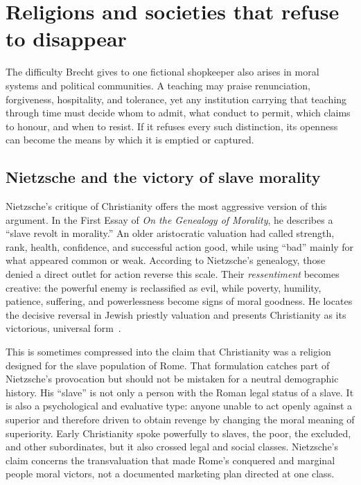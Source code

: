 ﻿\documentclass[12pt,a4paper]{book}
\begin{document}
\section{Religions and societies that refuse to disappear}

The difficulty Brecht gives to one fictional shopkeeper also arises in moral
systems and political communities.  A teaching may praise renunciation,
forgiveness, hospitality, and tolerance, yet any institution carrying that
teaching through time must decide whom to admit, what conduct to permit, which
claims to honour, and when to resist.  If it refuses every such distinction,
its openness can become the means by which it is emptied or captured.

\subsection{Nietzsche and the victory of slave morality}

Nietzsche's critique of Christianity offers the most aggressive version of
this argument.  In the First Essay of \emph{On the Genealogy of Morality}, he
describes a ``slave revolt in morality.''  An older aristocratic valuation had
called strength, rank, health, confidence, and successful action good, while
using ``bad'' mainly for what appeared common or weak.  According to
Nietzsche's genealogy, those denied a direct outlet for action reverse this
scale.  Their \emph{ressentiment} becomes creative: the powerful enemy is
reclassified as evil, while poverty, humility, patience, suffering, and
powerlessness become signs of moral goodness.  He locates the decisive reversal
in Jewish priestly valuation and presents Christianity as its victorious,
universal form~\cite[First Essay, \S\S~7--10 and 16]{Nietzsche-GM}.

This is sometimes compressed into the claim that Christianity was a religion
designed for the slave population of Rome.  That formulation catches part of
Nietzsche's provocation but should not be mistaken for a neutral demographic
history.  His ``slave'' is not only a person with the Roman legal status of a
slave.  It is also a psychological and evaluative type: anyone unable to act
openly against a superior and therefore driven to obtain revenge by changing
the moral meaning of superiority.  Early Christianity spoke powerfully to
slaves, the poor, the excluded, and other subordinates, but it also crossed
legal and social classes.  Nietzsche's claim concerns the transvaluation that
made Rome's conquered and marginal people moral victors, not a documented
marketing plan directed at one class.
\end{document}
